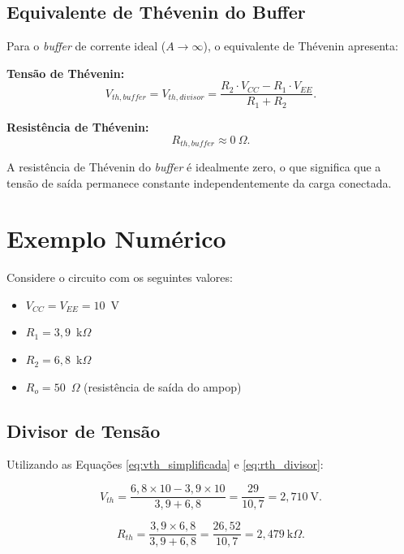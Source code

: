 \subsection{Equivalente de Thévenin do Buffer}

Para o \textit{buffer} de corrente ideal ($A \to \infty$), o equivalente de Thévenin apresenta:

\textbf{Tensão de Thévenin:}
\begin{equation}
    V_{th,buffer} = V_{th,divisor} = \frac{R_2 \cdot V_{CC} - R_1 \cdot V_{EE}}{R_1 + R_2}.
    \label{eq:vth_buffer}
\end{equation}

\textbf{Resistência de Thévenin:}
\begin{equation}
    R_{th,buffer} \approx 0~\Omega.
    \label{eq:rth_buffer}
\end{equation}

A resistência de Thévenin do \textit{buffer} é idealmente zero, o que significa que a tensão de saída permanece constante independentemente da carga conectada.

\section{Exemplo Numérico}

Considere o circuito com os seguintes valores:
\begin{itemize}
    \item $V_{CC} = V_{EE} = 10$~V
    \item $R_1 = 3{,}9$~k$\Omega$
    \item $R_2 = 6{,}8$~k$\Omega$
    \item $R_o = 50$~$\Omega$ (resistência de saída do ampop)
\end{itemize}

\subsection{Divisor de Tensão}

Utilizando as Equações \ref{eq:vth_simplificada} e \ref{eq:rth_divisor}:

\begin{equation}
    V_{th} = \frac{6{,}8 \times 10 - 3{,}9 \times 10}{3{,}9 + 6{,}8} = \frac{29}{10{,}7} = 2{,}710~\text{V}.
\end{equation}

\begin{equation}
    R_{th} = \frac{3{,}9 \times 6{,}8}{3{,}9 + 6{,}8} = \frac{26{,}52}{10{,}7} = 2{,}479~\text{k}\Omega.
\end{equation}

